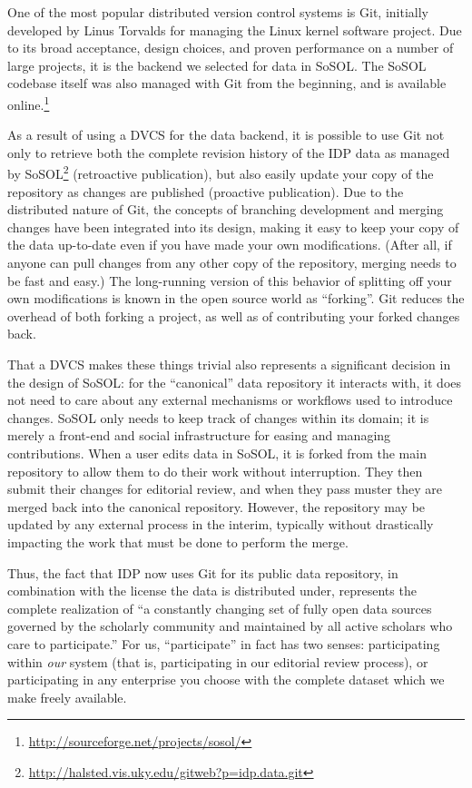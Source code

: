 \documentclass[]{article}
\begin{document}
One of the most popular distributed version control systems is Git, initially developed by Linus Torvalds for managing the Linux kernel software project. Due to its broad acceptance, design choices, and proven performance on a number of large projects, it is the backend we selected for data in SoSOL. The SoSOL codebase itself was also managed with Git from the beginning, and is available online.\footnote{\url{http://sourceforge.net/projects/sosol/}}

As a result of using a DVCS for the data backend, it is possible to use Git not only to retrieve both the complete revision history of the IDP data as managed by SoSOL\footnote{\url{http://halsted.vis.uky.edu/gitweb?p=idp.data.git}} (retroactive publication), but also easily update your copy of the repository as changes are published (proactive publication). Due to the distributed nature of Git, the concepts of branching development and merging changes have been integrated into its design, making it easy to keep your copy of the data up-to-date even if you have made your own modifications. (After all, if anyone can pull changes from any other copy of the repository, merging needs to be fast and easy.) The long-running version of this behavior of splitting off your own modifications is known in the open source world as “forking”. Git reduces the overhead of both forking a project, as well as of contributing your forked changes back.

That a DVCS makes these things trivial also represents a significant decision in the design of SoSOL: for the “canonical” data repository it interacts with, it does not need to care about any external mechanisms or workflows used to introduce changes. SoSOL only needs to keep track of changes within its domain; it is merely a front-end and social infrastructure for easing and managing contributions. When a user edits data in SoSOL, it is forked from the main repository to allow them to do their work without interruption. They then submit their changes for editorial review, and when they pass muster they are merged back into the canonical repository. However, the repository may be updated by any external process in the interim, typically without drastically impacting the work that must be done to perform the merge.

Thus, the fact that IDP now uses Git for its public data repository, in combination with the license the data is distributed under, represents the complete realization of “a constantly changing set of fully open data sources governed by the scholarly community and maintained by all active scholars who care to participate.” For us, “participate” in fact has two senses: participating within \emph{our} system (that is, participating in our editorial review process), or participating in any enterprise you choose with the complete dataset which we make freely available.
\end{document}
